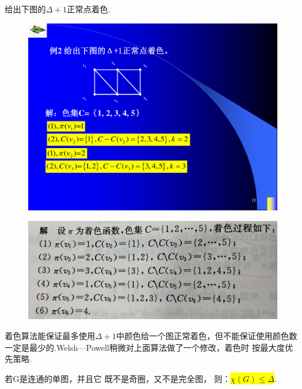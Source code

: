 \begin{example}
	给出下图的$\varDelta+1$正常点着色.
\begin{figure}[htbp]
	\centering
	\begin{minipage}{0.49\linewidth}
		\flushright
		\includegraphics[scale=0.635]{image/CH7_dianzhuose1.pdf}  
		\label{chutian1}%
	\end{minipage}
	\begin{minipage}{0.49\linewidth}
		\centering
	\includegraphics[width=0.9\linewidth]{image/CH7_dianzhuose.pdf} 
		\label{chutian2}%
	\end{minipage}
\end{figure}
\end{example}


\begin{note}
	着色算法能保证最多使用$\varDelta+1$中颜色给一个图正常着色，但不能保证使用颜色数一定是最少的.Welsh—Powell稍微对上面算法做了一个修改，着色时
	按最大度优先策略.
\end{note}

\begin{theorem}[布鲁克斯，1941]
	若G是连通的单图，并且它
	既不是奇圈，又不是完全图， 则：\colorbox{yellow}{$\chi(G)\leq \varDelta$}.
\end{theorem}




